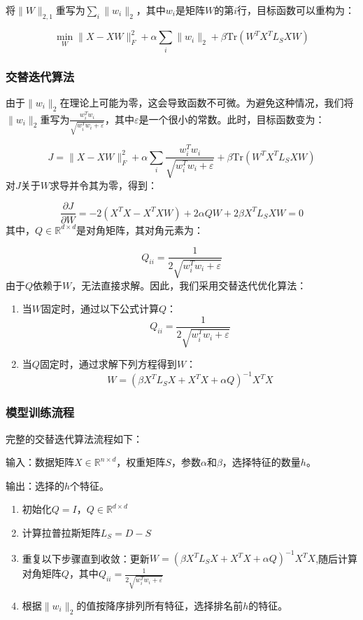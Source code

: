 \documentclass[12pt,a4paper,UTF8]{article}
\begin{document}
 将$\|W\|_{2,1}$重写为$\sum_i \|w_i\|_2$，其中$w_i$是矩阵$W$的第$i$行，目标函数可以重构为：
 
 $$
 \min_W \|X - XW\|_F^2 + \alpha\sum_i \|w_i\|_2 + \beta\text{Tr}(W^TX^TL_SXW)
 $$
 
 \subsubsection{交替迭代算法}
 由于$\|w_i\|_2$在理论上可能为零，这会导致函数不可微。为避免这种情况，我们将$\|w_i\|_2$重写为$\frac{w_i^Tw_i}{\sqrt{w_i^Tw_i + \varepsilon}}$，其中$\varepsilon$是一个很小的常数。此时，目标函数变为：
 
 $$
 J = \|X - XW\|_F^2 + \alpha\sum_i \frac{w_i^Tw_i}{\sqrt{w_i^Tw_i + \varepsilon}} + \beta\text{Tr}(W^TX^TL_SXW)
 $$
 对$J$关于$W$求导并令其为零，得到：
 
 $$
 \frac{\partial J}{\partial W} = -2(X^TX - X^TXW) + 2\alpha QW + 2\beta X^TL_SXW = 0
 $$
 其中，$Q \in \mathbb{R}^{d \times d}$是对角矩阵，其对角元素为：
 
 $$
 Q_{ii} = \frac{1}{2\sqrt{w_i^Tw_i + \varepsilon}}
 $$
 由于$Q$依赖于$W$，无法直接求解。因此，我们采用交替迭代优化算法：
 
    \begin{enumerate}
 	\item 当$W$固定时，通过以下公式计算$Q$：
 	$$
 	Q_{ii} = \frac{1}{2\sqrt{w_i^Tw_i + \varepsilon}}
 	$$
 	\item 当$Q$固定时，通过求解下列方程得到$W$：
 	$$
 	W = (\beta X^TL_SX + X^TX + \alpha Q)^{-1}X^TX
 	$$
 \end{enumerate}

 
 \subsubsection{模型训练流程}
 完整的交替迭代算法流程如下：
 
 输入：数据矩阵$X \in \mathbb{R}^{n \times d}$，权重矩阵$S$，参数$\alpha$和$\beta$，选择特征的数量$h$。
 
 输出：选择的$h$个特征。
    \begin{enumerate}
 	\item 初始化$Q = I$，$Q \in \mathbb{R}^{d \times d}$
 	\item 计算拉普拉斯矩阵$L_S = D - S$
 	\item  重复以下步骤直到收敛：更新$W = (\beta X^TL_SX + X^TX + \alpha Q)^{-1}X^TX$,随后计算对角矩阵$Q$，其中$Q_{ii} = \frac{1}{2\sqrt{w_i^Tw_i + \varepsilon}}$
 	\item 根据$\|w_i\|_2$的值按降序排列所有特征，选择排名前$h$的特征。
 \end{enumerate}
 
\end{document}

